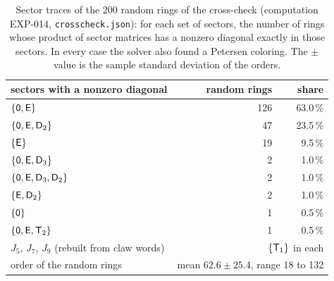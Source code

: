 \begin{table}[t]\centering\small
\begin{tabular}{lrr}
\toprule
sectors with a nonzero diagonal & random rings & share \\
\midrule
$\{\mathsf{0},\mathsf{E}\}$ & 126 & 63.0\,\% \\
$\{\mathsf{0},\mathsf{E},\mathsf{D}_2\}$ & 47 & 23.5\,\% \\
$\{\mathsf{E}\}$ & 19 & 9.5\,\% \\
$\{\mathsf{0},\mathsf{E},\mathsf{D}_3\}$ & 2 & 1.0\,\% \\
$\{\mathsf{0},\mathsf{E},\mathsf{D}_3,\mathsf{D}_2\}$ & 2 & 1.0\,\% \\
$\{\mathsf{E},\mathsf{D}_2\}$ & 2 & 1.0\,\% \\
$\{\mathsf{0}\}$ & 1 & 0.5\,\% \\
$\{\mathsf{0},\mathsf{E},\mathsf{T}_2\}$ & 1 & 0.5\,\% \\
\midrule
$J_5$, $J_7$, $J_9$ (rebuilt from claw words) & \multicolumn{2}{r}{$\{\mathsf{T}_1\}$ in each} \\
order of the random rings & \multicolumn{2}{r}{mean $62.6 \pm 25.4$, range 18 to 132} \\
\bottomrule
\end{tabular}
\caption{Sector traces of the 200 random rings of the cross-check (computation EXP-014, \texttt{crosscheck.json}): for each set of sectors, the number of rings whose product of sector matrices has a nonzero diagonal exactly in those sectors. In every case the solver also found a Petersen coloring. The $\pm$ value is the sample standard deviation of the orders.}\label{tab:cross}
\end{table}
